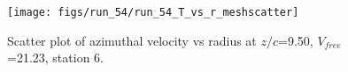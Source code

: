\begin{figure}[H]
\centering
\texttt{[image: figs/run\_54/run\_54\_T\_vs\_r\_meshscatter]}
\caption{Scatter plot of azimuthal velocity vs radius at $z/c$=9.50, $V_{free}$=21.23, station 6.}
\label{fig:run_54_T_vs_r_meshscatter}
\end{figure}


